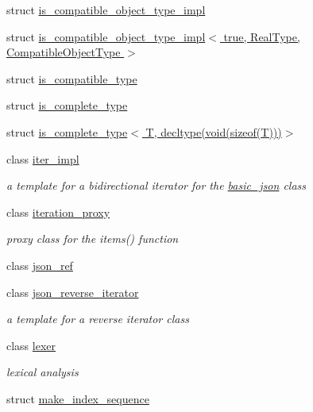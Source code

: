 \begin{DoxyCompactItemize}
\item 
struct \hyperlink{structnlohmann_1_1detail_1_1is__compatible__object__type__impl}{is\+\_\+compatible\+\_\+object\+\_\+type\+\_\+impl}
\item 
struct \hyperlink{structnlohmann_1_1detail_1_1is__compatible__object__type__impl_3_01true_00_01_real_type_00_01_compatible_object_type_01_4}{is\+\_\+compatible\+\_\+object\+\_\+type\+\_\+impl$<$ true, Real\+Type, Compatible\+Object\+Type $>$}
\item 
struct \hyperlink{structnlohmann_1_1detail_1_1is__compatible__type}{is\+\_\+compatible\+\_\+type}
\item 
struct \hyperlink{structnlohmann_1_1detail_1_1is__complete__type}{is\+\_\+complete\+\_\+type}
\item 
struct \hyperlink{structnlohmann_1_1detail_1_1is__complete__type_3_01_t_00_01decltype_07void_07sizeof_07_t_08_08_08_4}{is\+\_\+complete\+\_\+type$<$ T, decltype(void(sizeof(\+T)))$>$}
\item 
class \hyperlink{classnlohmann_1_1detail_1_1iter__impl}{iter\+\_\+impl}
\begin{DoxyCompactList}\small\item\em a template for a bidirectional iterator for the \hyperlink{classnlohmann_1_1basic__json}{basic\+\_\+json} class \end{DoxyCompactList}\item 
class \hyperlink{classnlohmann_1_1detail_1_1iteration__proxy}{iteration\+\_\+proxy}
\begin{DoxyCompactList}\small\item\em proxy class for the items() function \end{DoxyCompactList}\item 
class \hyperlink{classnlohmann_1_1detail_1_1json__ref}{json\+\_\+ref}
\item 
class \hyperlink{classnlohmann_1_1detail_1_1json__reverse__iterator}{json\+\_\+reverse\+\_\+iterator}
\begin{DoxyCompactList}\small\item\em a template for a reverse iterator class \end{DoxyCompactList}\item 
class \hyperlink{classnlohmann_1_1detail_1_1lexer}{lexer}
\begin{DoxyCompactList}\small\item\em lexical analysis \end{DoxyCompactList}\item 
struct \hyperlink{structnlohmann_1_1detail_1_1make__index__sequence}{make\+\_\+index\+\_\+sequence}

\end{DoxyCompactItemize}
